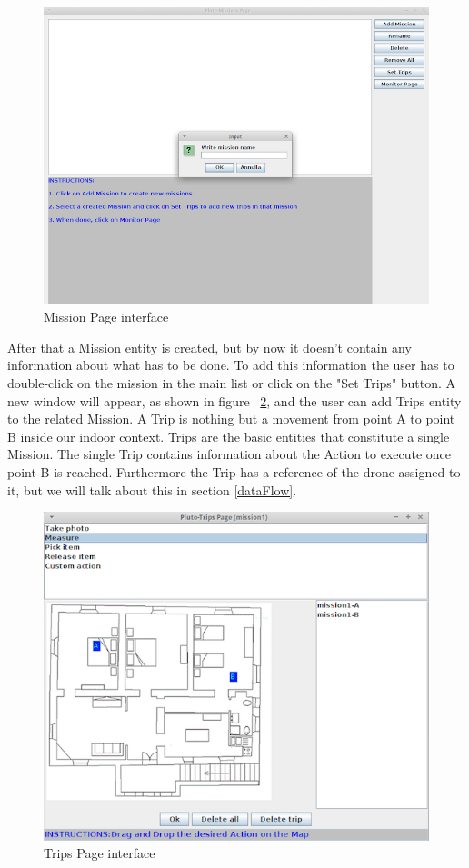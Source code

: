 \begin{figure}[H]
  \centering
  \includegraphics[width=\linewidth]{pictures/MissionPage.png}
  \caption{Mission Page interface}
  \label{fig:MissionPage}
\end{figure}


After that a Mission entity is created, but by now it doesn't contain any information about what has to be done. To add this information the user has to double-click on the mission in the main list or click on the "Set Trips" button. A new window will appear, as shown in figure  ~\ref{fig:TripsPage}, and the user can add Trips entity to the related Mission. A Trip is nothing but a movement from point A to point B inside our indoor context. Trips are the basic entities that constitute a single Mission. The single Trip contains information about the Action to execute once point B is reached. Furthermore the Trip has a reference of the drone assigned to it, but we will talk about this in section \ref{dataFlow}.

\begin{figure}[H]
  \centering
  \includegraphics[width=\linewidth]{pictures/TripsPage.png}
  \caption{Trips Page interface}
  \label{fig:TripsPage}
\end{figure}

